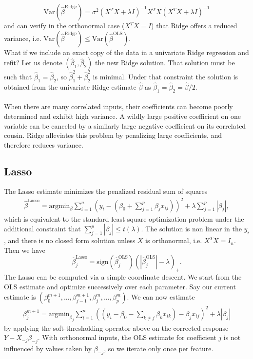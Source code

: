 \documentclass[]{article}
\begin{document}
\begin{equation}
\mathrm{Var}(\hat{\beta}^{\mathrm{Ridge}})= \sigma^2 (X^TX+\lambda I)^{-1}X^T X(X^TX+\lambda I)^{-1}
\end{equation}
and can verify in the orthonormal case ($X^TX=I$) that Ridge offers a reduced variance, i.e. $\mathrm{Var}(\hat{\beta}^{\mathrm{Ridge}})\leq \mathrm{Var}(\hat{\beta}^{\mathrm{OLS}})$.\\

\noindent What if we include an exact copy of the data in a univariate Ridge regression and refit? Let us denote $(\hat{\beta}_1,\hat{\beta}_2)$ the new Ridge solution. That solution must be such that $\hat{\beta}_1=\hat{\beta}_2$, so $\hat{\beta}_1^2+\hat{\beta}_2^2$ is minimal. Under that constraint the solution is obtained from the univariate Ridge estimate $\hat{\beta}$ as $\hat{\beta}_1=\hat{\beta}_2=\hat{\beta}/2$. \\ \\
When there are many correlated inputs, their coefficients can become poorly determined and exhibit high variance. A wildly large positive coefficient on one variable can be canceled by a similarly large negative coefficient on its correlated cousin. Ridge alleviates this problem by penalizing large coefficients, and therefore reduces variance.

\subsection{Lasso}

The Lasso estimate minimizes the penalized residual sum of squares
\begin{eqnarray}
\hat{\beta}^{\mathrm{Lasso}} = \mathrm{argmin}_{\beta}\sum_{i=1}^n \left(y_i-(\beta_0 + \sum_{j=1}^p \beta_j x_{ij})\right)^2+\lambda \sum_{j=1}^p |\beta_j|,
\end{eqnarray}
which is equivalent to the standard least square optimization problem under the additional constraint that $\sum_{j=1}^p |\beta_j| \leq t(\lambda)$. The solution is non linear in the $y_i$, and there is no closed form solution unless $X$ is orthonormal, i.e. $X^T X=I_n$. Then we have
\begin{equation}
\hat{\beta}^{\mathrm{Lasso}}_j = \mathrm{sign}(\hat{\beta}_j^{\mathrm{OLS}})(|\hat{\beta}_j^{\mathrm{OLS}}|-\lambda)_+.
\end{equation}
\noindent The Lasso can be computed via a simple coordinate descent. We start from the OLS estimate and optimize successively over each parameter. Say our current estimate is $(\beta_0^{m+1},...,\beta_{j-1}^{m+1},\beta_j^m,...,\beta_p^m)$. We can now estimate 
\begin{eqnarray}
\beta_{j}^{m+1} = \mathrm{argmin}_{\beta_j}\sum_{i=1}^n \left((y_i-\beta_0 - \sum_{k\neq j} \beta_k x_{ik})-\beta_j x_{ij}\right)^2+\lambda |\beta_j|
\end{eqnarray}
by applying the soft-thresholding operator above on the corrected response $Y-X_{-j}\beta_{-j}$. With orthonormal inputs, the OLS estimate for coefficient $j$ is not influenced by values taken by $\beta_{-j}$, so we iterate only once per feature.
\end{document}
